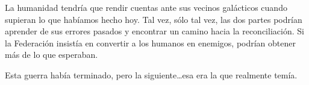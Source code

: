 La humanidad tendría que rendir cuentas ante sus vecinos galácticos cuando supieran lo que habíamos hecho hoy. Tal vez, sólo tal vez, las dos partes podrían aprender de sus errores pasados y encontrar un camino hacia la reconciliación. Si la Federación insistía en convertir a los humanos en enemigos, podrían obtener más de lo que esperaban.

Esta guerra había terminado, pero la siguiente…esa era la que realmente temía.